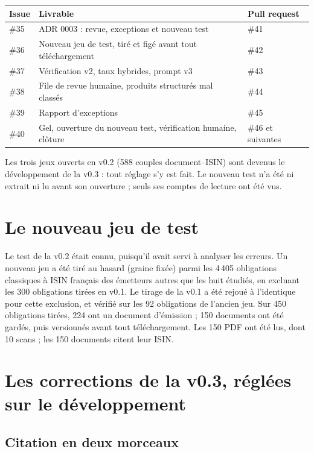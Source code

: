 \documentclass[11pt,a4paper]{article}
\begin{document}
\begin{table}[H]
\small
\begin{tabularx}{\linewidth}{lYl}
\toprule
\textbf{Issue} & \textbf{Livrable} & \textbf{Pull request} \\
\midrule
\#35 & ADR 0003 : revue, exceptions et nouveau test & \#41 \\
\#36 & Nouveau jeu de test, tiré et figé avant tout téléchargement & \#42 \\
\#37 & Vérification v2, taux hybrides, prompt v3 & \#43 \\
\#38 & File de revue humaine, produits structurés mal classés & \#44 \\
\#39 & Rapport d'exceptions & \#45 \\
\#40 & Gel, ouverture du nouveau test, vérification humaine, clôture & \#46 et suivantes \\
\bottomrule
\end{tabularx}
\end{table}

Les trois jeux ouverts en v0.2 (588 couples document--ISIN) sont devenus le développement de la v0.3 : tout réglage s'y est fait. Le nouveau test n'a été ni extrait ni lu avant son ouverture ; seuls ses comptes de lecture ont été vus.

\section{Le nouveau jeu de test}

Le test de la v0.2 était connu, puisqu'il avait servi à analyser les erreurs. Un nouveau jeu a été tiré au hasard (graine fixée) parmi les 4\,405 obligations classiques à ISIN français des émetteurs autres que les huit étudiés, en excluant les 300 obligations tirées en v0.1. Le tirage de la v0.1 a été rejoué à l'identique pour cette exclusion, et vérifié sur les 92 obligations de l'ancien jeu. Sur 450 obligations tirées, 224 ont un document d'émission ; 150 documents ont été gardés, puis versionnés avant tout téléchargement. Les 150 PDF ont été lus, dont 10 scans ; les 150 documents citent leur ISIN.

\section{Les corrections de la v0.3, réglées sur le développement}

\subsection{Citation en deux morceaux}
\end{document}
